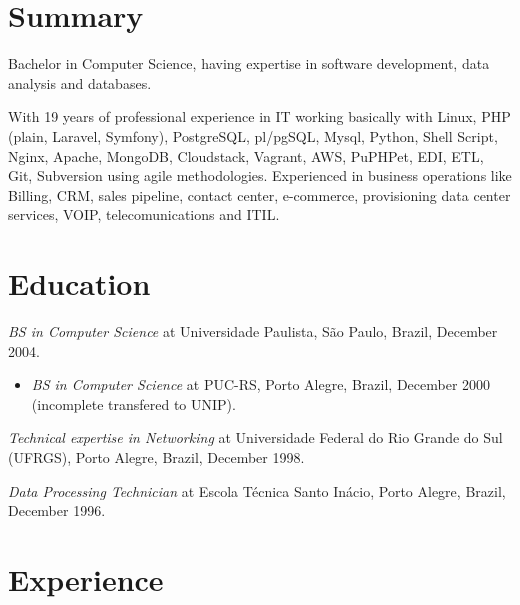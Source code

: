 \documentclass[margin]{res}
\begin{document}
  
\address{São Paulo, Brazil \\ andre.reis@gmail.com \\ Phone: +55 11 99328-9258 }
                           
                        
\begin{resume}                        
 
\section{Summary} Bachelor in Computer Science, having expertise in software development, data analysis and databases.
                        
                  With 19 years of professional experience in IT working basically with Linux, PHP (plain, Laravel, Symfony), PostgreSQL, pl/pgSQL, Mysql, Python, Shell Script, Nginx, Apache, MongoDB, Cloudstack, Vagrant, AWS, PuPHPet, EDI, ETL, Git, Subversion using agile methodologies. Experienced in business operations like Billing, CRM, sales pipeline, contact center, e-commerce, provisioning data center services, VOIP, telecomunications and ITIL.
 
\section{Education}	
    \textit{BS in Computer Science} at Universidade Paulista, São Paulo, Brazil, December 2004.
    
    \begin{itemize}
      \item \textit{BS in Computer Science} at PUC-RS, Porto Alegre, Brazil, December 2000 (incomplete transfered to UNIP).
    \end{itemize}

    \textit{Technical expertise in Networking} at Universidade Federal do Rio Grande do Sul (UFRGS), Porto Alegre, Brazil, December 1998.
    
    \textit{Data Processing Technician} at Escola Técnica Santo Inácio, Porto Alegre, Brazil, December 1996.


\section{Experience}


\end{resume}
\end{document}

